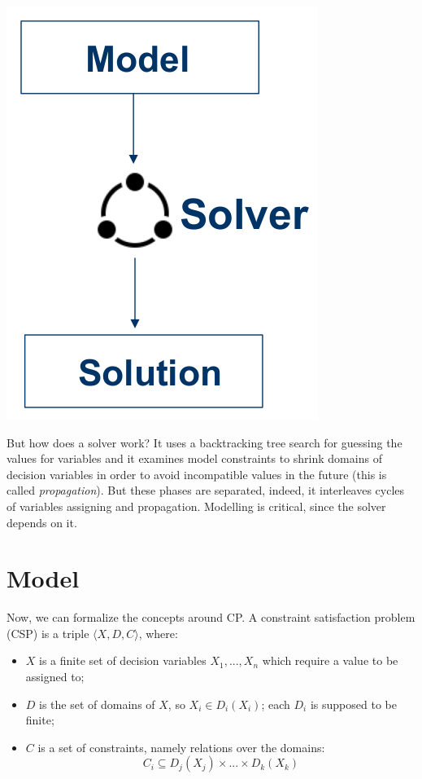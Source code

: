 \documentclass[10pt,a4paper]{article}
\begin{document}
\includegraphics[scale=0.2]{solver.png}

But how does a solver work? It uses a backtracking tree search for guessing the
values for variables and it examines model constraints to shrink domains of
decision variables in order to avoid incompatible values in the future (this is
called \textit{propagation}). But these phases are separated, indeed, it
interleaves cycles of variables assigning and propagation. Modelling is
critical, since the solver depends on it.

\pagebreak

\section{Model}
Now, we can formalize the concepts
around CP. A constraint satisfaction problem (CSP) is a triple $ \langle X, D,
C \rangle $, where:
\begin{itemize}
    \item $X$ is a finite set of decision variables $X_1, ..., X_n$ which
    require a value to be assigned to;
    \item $D$ is the set of domains of $X$, so $X_i \in D_i(X_i)$; each $D_i$ is
    supposed to be finite;
    \item $C$ is a set of constraints, namely relations over the domains:
    \[ C_i \subseteq D_j(X_j) \times ... \times D_k(X_k) \]
\end{itemize}
\end{document}
